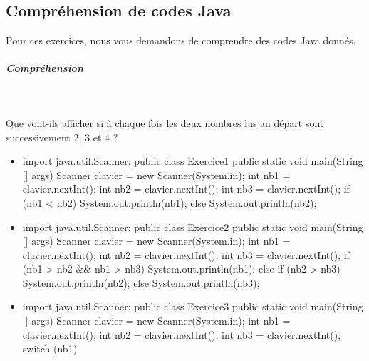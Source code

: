 \documentclass[11pt,a4paper]{article}
\begin{document}
        \subsection{Compr\'ehension de codes Java}
          Pour ces exercices, nous vous demandons de comprendre des codes Java donn\'es. 
          
			
		\subparagraph{Compr\'ehension} 
		
                \textcolor{white}{.} \par
            
							  Que vont-ils afficher si \`a chaque fois les deux nombres lus au d\'epart sont successivement 2, 3 et 4 ?
							
					\begin{itemize}
				
			\item \begin{Java}
import java.util.Scanner;
public class Exercice1 {
    public static void main(String [] args) {
        Scanner clavier = new Scanner(System.in);
        int nb1 = clavier.nextInt();
        int nb2 = clavier.nextInt();
        int nb3 = clavier.nextInt();
        if (nb1 < nb2){
          System.out.println(nb1);
        } else {
          System.out.println(nb2);
        } 
    }
}
        \end{Java} \textcolor{gray}{\underline{\hspace*{1em}}} 
			\item \begin{Java}
import java.util.Scanner;
public class Exercice2 {
    public static void main(String [] args) {
        Scanner clavier = new Scanner(System.in);
        int nb1 = clavier.nextInt();
        int nb2 = clavier.nextInt();
        int nb3 = clavier.nextInt();
        if (nb1 > nb2 && nb1 > nb3){
          System.out.println(nb1);
        } else {
            if (nb2 > nb3){
              System.out.println(nb2);
            } else {
              System.out.println(nb3);
            }
        } 
    }
}
        \end{Java} \textcolor{gray}{\underline{\hspace*{1em}}} 
			\item \begin{Java}
import java.util.Scanner;
public class Exercice3 {
    public static void main(String [] args) {
        Scanner clavier = new Scanner(System.in);
        int nb1 = clavier.nextInt();
        int nb2 = clavier.nextInt();
        int nb3 = clavier.nextInt();
        switch (nb1){
}}}
\end{Java}
\end{itemize}
\end{document}
